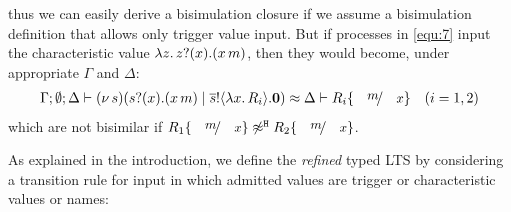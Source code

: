 \begin{example}
\noi thus we can easily derive a bisimulation closure if we 
assume a bisimulation definition that allows only trigger value input.
%
But if processes in \eqref{equ:7}
input the characteristic value $\lambda z.\,z ? (x) . (x\, {m})$,  
then they would become, under appropriate $\Gamma$ and $\Delta$:
%
\begin{eqnarray*}
	\Gamma; \es; \Delta \proves \newsp{s}{\binp{s}{x} (\appl{x}{m}) \Par \bout{\dual{s}}{\abs{x} R_i} \inact} \wbc \Delta \proves R_i \subst{m}{x}
\quad (i=1,2)
\end{eqnarray*}
\noi which are not bisimilar if $R_1 \subst{m}{x} \not\wb R_2 \subst{m}{x}$.
\end{example}

\smallskip 
\noi As explained in 
the introduction,
we define the
\emph{refined} typed LTS
by considering a transition rule for input in which admitted values are
trigger or characteristic values or names:


\smallskip 

